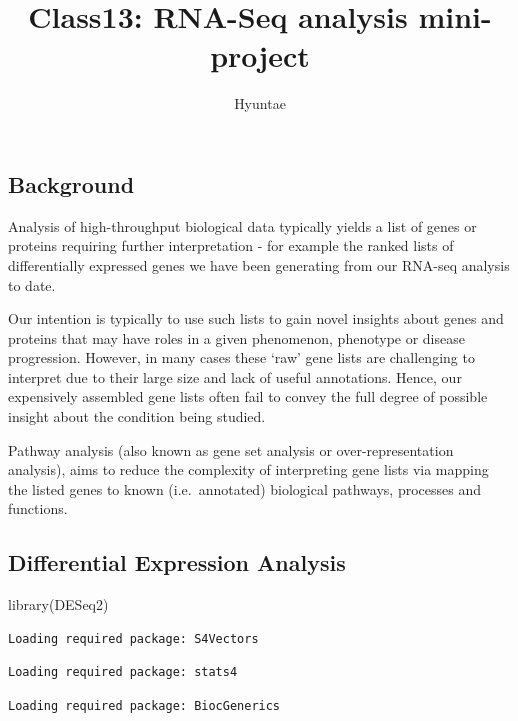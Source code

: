 \documentclass[
  letterpaper,
  DIV=11,
  numbers=noendperiod]{scrartcl}
\title{Class13: RNA-Seq analysis mini-project}
\author{Hyuntae}
\date{}
\newenvironment{Shaded}{\begin{snugshade}}{\end{snugshade}}
\newcommand{\FunctionTok}[1]{\textcolor[rgb]{0.28,0.35,0.67}{#1}}
\newcommand{\NormalTok}[1]{\textcolor[rgb]{0.00,0.23,0.31}{#1}}
\begin{document}
\maketitle


\subsection{Background}\label{background}

Analysis of high-throughput biological data typically yields a list of
genes or proteins requiring further interpretation - for example the
ranked lists of differentially expressed genes we have been generating
from our RNA-seq analysis to date.

Our intention is typically to use such lists to gain novel insights
about genes and proteins that may have roles in a given phenomenon,
phenotype or disease progression. However, in many cases these `raw'
gene lists are challenging to interpret due to their large size and lack
of useful annotations. Hence, our expensively assembled gene lists often
fail to convey the full degree of possible insight about the condition
being studied.

Pathway analysis (also known as gene set analysis or over-representation
analysis), aims to reduce the complexity of interpreting gene lists via
mapping the listed genes to known (i.e.~annotated) biological pathways,
processes and functions.

\subsection{Differential Expression
Analysis}\label{differential-expression-analysis}

\begin{Shaded}
\begin{Highlighting}[]
\FunctionTok{library}\NormalTok{(DESeq2)}
\end{Highlighting}
\end{Shaded}

\begin{verbatim}
Loading required package: S4Vectors
\end{verbatim}

\begin{verbatim}
Loading required package: stats4
\end{verbatim}

\begin{verbatim}
Loading required package: BiocGenerics
\end{verbatim}
\end{document}
